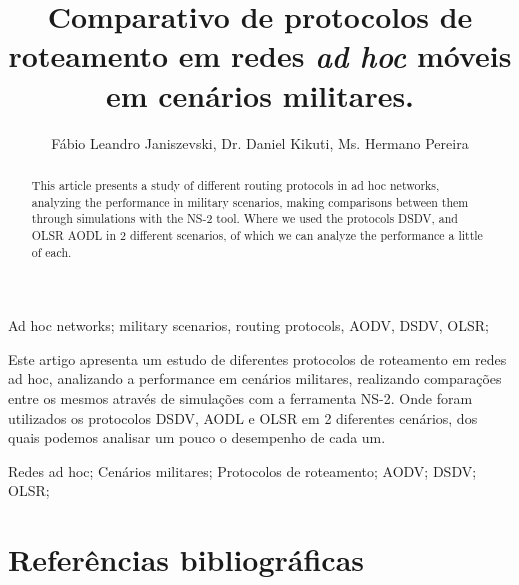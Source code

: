 \documentclass[12pt]{article}
\title{Comparativo de protocolos de roteamento em redes \textit{ad hoc} m\'oveis em cen\'arios militares.}
\author{
	F\'abio Leandro Janiszevski\inst{1}, 
	Dr. Daniel Kikuti\inst{1}, 
	Ms. Hermano Pereira\inst{2}
}
\begin{document}
  \setlength{\leftmargini}{1.70cm}
  \setlength{\labelsep}{.5em}
  \setlength{\parindent}{1.27cm}
  \setlength{\parskip}{6pt}

\maketitle

\begin{abstract}
This article presents a study of different routing protocols in ad hoc networks, analyzing the performance in military scenarios, making comparisons between them through simulations with the NS-2 tool.
Where we used the protocols DSDV, and OLSR AODL in 2 different scenarios, of which we can analyze the performance a little of each.
\end{abstract}

\begin{keyWord}
Ad hoc networks; military scenarios, routing protocols, AODV, DSDV, OLSR;
\end{keyWord}

\begin{resumo}
Este artigo apresenta um estudo de diferentes protocolos de roteamento em redes ad hoc, analizando a performance em cen\'arios militares, realizando compara\c{c}\~oes entre os mesmos atrav\'es de simula\c{c}\~oes com a ferramenta NS-2. 
Onde foram utilizados os protocolos DSDV, AODL e OLSR em 2 diferentes cen\'arios, dos quais podemos analisar um pouco o desempenho de cada um.
\end{resumo}

\begin{palavraChave}
Redes ad hoc; Cen\'arios militares; Protocolos de roteamento; AODV; DSDV; OLSR;
\end{palavraChave}


\newpage
\section{Refer\^encias bibliogr\'aficas}
%

\def\bibindent{0.5cm}
\renewcommand{\emph}{\textbf}

\end{document}
